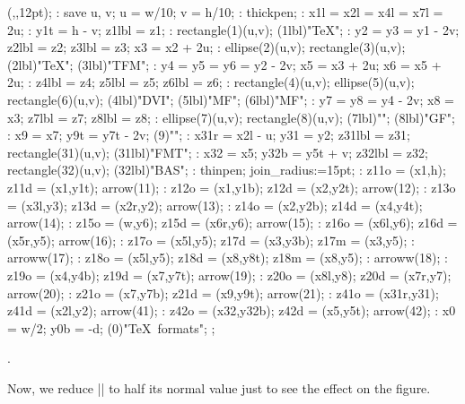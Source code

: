 \ifdim\hsize<10cm \let\figfont=\smallsf \def\driver{drv}
 \else \let\figfont=\sf \def\driver{Driver}\fi

\MTbeginchar(\the\hsize,\the{},12pt);
\MT: save u, v; u = w/10; v = h/10;
\MT: thickpen;
\MT: x1l = x2l = x4l = x7l = 2u;
\MT: y1t = h - v; z1lbl = z1;
\MT: rectangle(1)(u,v);
\MTlabel(1lbl)"\figfont\TeX";
\MT: y2 = y3 = y1 - 2v; z2lbl = z2; z3lbl = z3; x3 = x2 + 2u;
\MT: ellipse(2)(u,v); rectangle(3)(u,v);
\MTlabel(2lbl)"\figfont\TeX"; \MTlabel(3lbl)"\figfont TFM";
\MT: y4 = y5 = y6 = y2 - 2v; x5 = x3 + 2u; x6 = x5 + 2u;
\MT: z4lbl = z4; z5lbl = z5; z6lbl = z6;
\MT: rectangle(4)(u,v); ellipse(5)(u,v); rectangle(6)(u,v);
\MTlabel(4lbl)"\figfont DVI"; \MTlabel(5lbl)"\figfont MF";
\MTlabel(6lbl)"\figfont MF";
\MT: y7 = y8 = y4 - 2v; x8 = x3; z7lbl = z7; z8lbl = z8;
\MT: ellipse(7)(u,v); rectangle(8)(u,v);
\MTlabel(7lbl)"\figfont\driver"; \MTlabel(8lbl)"\figfont GF";
\MT: x9 = x7; y9t = y7t - 2v;
\MTlabel(9)"";
\MT: x31r = x2l - u; y31 = y2; z31lbl = z31; rectangle(31)(u,v);
\MTlabel(31lbl)"\figfont FMT";
\MT: x32 = x5; y32b = y5t + v; z32lbl = z32; rectangle(32)(u,v);
\MTlabel(32lbl)"\figfont BAS";
\MT: thinpen; join_radius:=15pt;
\MT: z11o = (x1,h); z11d = (x1,y1t); arrow(11);
\MT: z12o = (x1,y1b); z12d = (x2,y2t); arrow(12);
\MT: z13o = (x3l,y3); z13d = (x2r,y2); arrow(13);
\MT: z14o = (x2,y2b); z14d = (x4,y4t); arrow(14);
\MT: z15o = (w,y6); z15d = (x6r,y6); arrow(15);
\MT: z16o = (x6l,y6); z16d = (x5r,y5); arrow(16);
\MT: z17o = (x5l,y5); z17d = (x3,y3b); z17m = (x3,y5);
\MT: arroww(17);
\MT: z18o = (x5l,y5); z18d = (x8,y8t); z18m = (x8,y5);
\MT: arroww(18);
\MT: z19o = (x4,y4b); z19d = (x7,y7t); arrow(19);
\MT: z20o = (x8l,y8); z20d = (x7r,y7); arrow(20);
\MT: z21o = (x7,y7b); z21d = (x9,y9t); arrow(21);
\MT: z41o = (x31r,y31); z41d = (x2l,y2); arrow(41);
\MT: z42o = (x32,y32b); z42d = (x5,y5t); arrow(42);
\MT: x0 = w/2; y0b = -d;
\MTlabel(0)"\rm \TeX\ formats";
\MTendchar;

\centerline{\box\MTbox}
.




\divide{}
Now, we reduce |\hsize| to half its normal value just to see the
effect on the figure.



\bigbreak

\multiply{}




